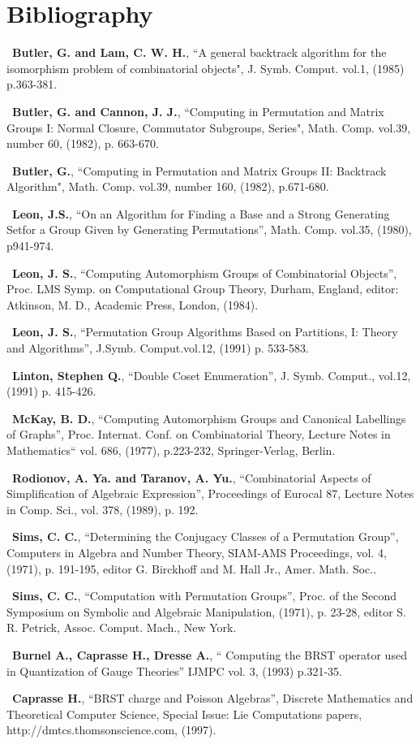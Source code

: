 \section{Bibliography}
\begin{list}{-}{\parsep 0in \itemsep 1pt}     
\item\  {\bf Butler, G. and Lam, C. W. H.},
   ``A general backtrack algorithm for the isomorphism problem of
     combinatorial objects",
 J. Symb. Comput. vol.1, (1985) p.363-381.
\item\ {\bf Butler, G. and Cannon, J. J.},
    ``Computing in Permutation and Matrix Groups {I}: Normal Closure,
        Commutator Subgroups, Series",
 Math. Comp. vol.39, number 60, (1982), p. 663-670.
\item\ {\bf Butler, G.},
     ``Computing in Permutation and Matrix Groups {II}:
       Backtrack Algorithm",  Math. Comp. vol.39, number 160,
      (1982), p.671-680.
\item\  {\bf Leon, J.S.},
 ``On an Algorithm for Finding a Base and a Strong 
Generating Setfor a Group Given by Generating Permutations'',
Math. Comp. vol.35, (1980), p941-974.
\item\  {\bf Leon, J. S.},
 ``Computing Automorphism Groups of Combinatorial Objects'',
 Proc. {LMS} Symp. on Computational Group Theory, Durham,
                  England, editor: Atkinson, M. D.,
 Academic Press, London, (1984). 
\item\  {\bf Leon, J. S.},
``Permutation Group Algorithms Based on Partitions, {I}: Theory and
          Algorithms'', J.Symb. Comput.vol.12, (1991) p. 533-583.
\item\  {\bf Linton, Stephen Q.}, ``Double Coset Enumeration'',
        J. Symb. Comput., vol.12, (1991) p. 415-426.
\item\ {\bf McKay, B. D.},
``Computing Automorphism Groups and Canonical Labellings of Graphs'',
Proc. Internat. Conf. on Combinatorial Theory,
Lecture Notes in Mathematics`` vol. 686, (1977), p.223-232,
Springer-Verlag, Berlin.
\item\ {\bf Rodionov, A. Ya. and Taranov, A. Yu.},
``Combinatorial Aspects of Simplification of
Algebraic Expression'', Proceedings of Eurocal 87,
Lecture Notes in Comp. Sci., vol. 378,  (1989), p. 192.
\item\ {\bf Sims, C. C.},
``Determining the Conjugacy Classes of a Permutation Group'',
Computers in Algebra and Number Theory,
SIAM-AMS Proceedings, vol. 4, (1971), p. 191-195,
editor G. Birckhoff and M. {Hall Jr.}, Amer. Math. Soc..
\item\ {\bf Sims, C. C.},
``Computation with Permutation Groups'',
Proc. of the Second Symposium on Symbolic and Algebraic
                          Manipulation, (1971), p. 23-28,
editor S. R. Petrick, Assoc. Comput. Mach., New York.
\item\ {\bf   Burnel A., Caprasse H., Dresse A.},
`` Computing the BRST operator used in Quantization of Gauge Theories''
IJMPC vol. 3, (1993) p.321-35.
\item\ {\bf Caprasse H.},
``BRST charge and Poisson Algebras'',
Discrete Mathematics and Theoretical Computer Science,
Special Issue: Lie Computations papers, http://dmtcs.thomsonscience.com,
(1997).
\end{list}

